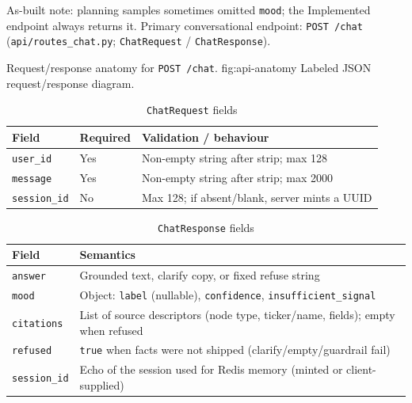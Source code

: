 \noindent
As-built note: planning samples sometimes omitted \texttt{mood}; the Implemented endpoint always returns it. Primary conversational endpoint: \texttt{POST /chat} (\texttt{api/routes\_chat.py}; \texttt{ChatRequest} / \texttt{ChatResponse}).

%
{Request/response anatomy for \texttt{POST /chat}.}%
{fig:api-anatomy}%
{Labeled JSON request/response diagram.}

\begin{table}[!htbp]
\centering
\small
\caption{\texttt{ChatRequest} fields}
\label{tab:chat-request}
\begin{tabularx}{\textwidth}{@{}
  >{\raggedright\arraybackslash}p{}
  >{\raggedright\arraybackslash}p{}
  >{\raggedright\arraybackslash}X
  @{}}
\toprule
\textbf{Field} & \textbf{Required} & \textbf{Validation / behaviour} \\
\midrule
\texttt{user\_id} & Yes & Non-empty string after strip; max 128 \\
\addlinespace
\texttt{message} & Yes & Non-empty string after strip; max 2000 \\
\addlinespace
\texttt{session\_id} & No & Max 128; if absent/blank, server mints a UUID \\
\bottomrule
\end{tabularx}
\end{table}

\begin{table}[!htbp]
\centering
\small
\caption{\texttt{ChatResponse} fields}
\label{tab:chat-response}
\begin{tabularx}{\textwidth}{@{}
  >{\raggedright\arraybackslash}p{}
  >{\raggedright\arraybackslash}X
  @{}}
\toprule
\textbf{Field} & \textbf{Semantics} \\
\midrule
\texttt{answer} & Grounded text, clarify copy, or fixed refuse string \\
\addlinespace
\texttt{mood} & Object: \texttt{label} (nullable), \texttt{confidence}, \texttt{insufficient\_signal} \\
\addlinespace
\texttt{citations} & List of source descriptors (node type, ticker/name, fields); empty when refused \\
\addlinespace
\texttt{refused} & \texttt{true} when facts were not shipped (clarify/empty/guardrail fail) \\
\addlinespace
\texttt{session\_id} & Echo of the session used for Redis memory (minted or client-supplied) \\
\bottomrule
\end{tabularx}
\end{table}


